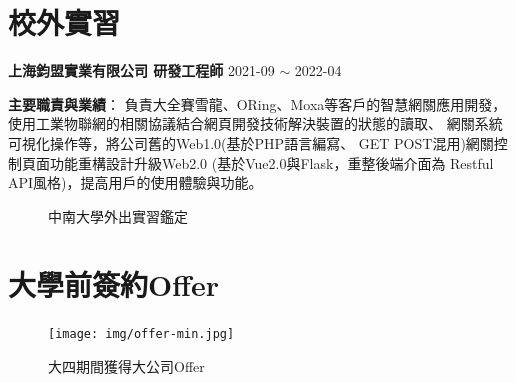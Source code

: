 \documentclass[classical]{einfart}
\begin{document}
\newpage

\section{校外實習}

\textbf{上海鈞盟實業有限公司 \quad 研發工程師} \hfill 2021-09 $\sim$ 2022-04

\textbf{主要職責與業績}： \quad 負責大全賽雪龍、ORing、Moxa等客戶的智慧網關應用開發，
使用工業物聯網的相關協議結合網頁開發技術解決裝置的狀態的讀取、
網關系統可視化操作等，將公司舊的Web1.0(基於PHP語言編寫、
GET POST混用)網關控制頁面功能重構設計升級Web2.0
(基於Vue2.0與Flask，重整後端介面為 Restful API風格)，提高用戶的使用體驗與功能。

\begin{figure}[H]
  \centering
    \caption{中南大學外出實習鑑定}
\end{figure}

\section{大學前簽約Offer}

\begin{figure}[H]
  \centering
  \texttt{[image: img/offer-min.jpg]}
  \caption{大四期間獲得大公司Offer}
\end{figure}

\newpage
\end{document}
